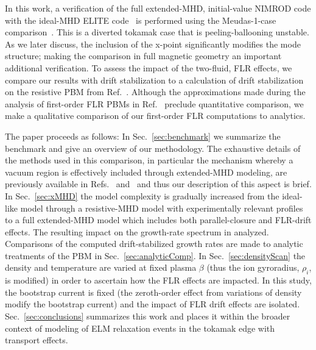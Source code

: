 
In this work, a verification of the full extended-MHD, initial-value NIMROD
code with the ideal-MHD ELITE code~\cite{wilson02,Snyder02,snyder04} is
performed using the Meudas-1-case comparison~\cite{Snyder09}. This is a
diverted tokamak case that is peeling-ballooning unstable. As we later
discuss, the inclusion of the x-point significantly modifies the mode
structure; making the comparison in full magnetic geometry an important
additional verification.  To assess the impact of the two-fluid, FLR effects,
we compare our results with drift stabilization to a calculation of drift
stabilization on the resistive PBM from Ref.~\cite{Hastie03}.  Although the
approximations made during the analysis of first-order FLR PBMs in
Ref.~\cite{Hastie03} preclude quantitative comparison, we make a qualitative
comparison of our first-order FLR computations to analytics.  

The paper proceeds as follows: In Sec.~\ref{sec:benchmark} we summarize the
benchmark and give an overview of our methodology.  The exhaustive details of
the methods used in this comparison, in particular the mechanism whereby a
vacuum region is effectively included through extended-MHD modeling, are
previously available in Refs.~\cite{Burke10} and~\cite{Ferraro10} and thus our
description of this aspect is brief.  In Sec.~\ref{sec:xMHD} the model
complexity is gradually increased from the ideal-like model through a
resistive-MHD model with experimentally relevant profiles to a full
extended-MHD model which includes both parallel-closure and FLR-drift effects.
The resulting impact on the growth-rate spectrum in analyzed. Comparisons
of the computed drift-stabilized growth rates are made to analytic treatments
of the PBM in Sec.~\ref{sec:analyticComp}.
In Sec.~\ref{sec:densityScan} the density and temperature are varied at fixed
plasma $\beta$ (thus the ion gyroradius, $\rho_i$, is modified) in order to
ascertain how the FLR effects are impacted.  In this study, the bootstrap
current is fixed (the zeroth-order effect from variations of density modify the
bootstrap current) and the impact of FLR drift effects are isolated.
Sec.~\ref{sec:conclusions} summarizes this work and places it within the
broader context of modeling of ELM relaxation events in the tokamak edge with
transport effects.
